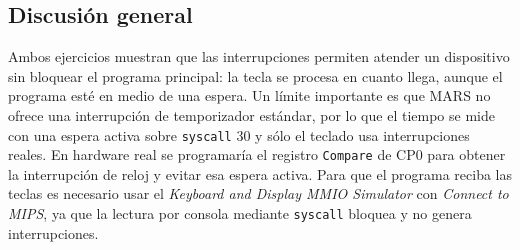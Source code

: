 \documentclass[11pt,a4paper]{article}
\begin{document}
\subsection*{Discusión general}

Ambos ejercicios muestran que las interrupciones permiten atender un dispositivo sin bloquear el programa principal: la tecla se procesa en cuanto llega, aunque el programa esté en medio de una espera. Un límite importante es que MARS no ofrece una interrupción de temporizador estándar, por lo que el tiempo se mide con una espera activa sobre \texttt{syscall} 30 y sólo el teclado usa interrupciones reales. En hardware real se programaría el registro \texttt{Compare} de CP0 para obtener la interrupción de reloj y evitar esa espera activa. Para que el programa reciba las teclas es necesario usar el \emph{Keyboard and Display MMIO Simulator} con \emph{Connect to MIPS}, ya que la lectura por consola mediante \texttt{syscall} bloquea y no genera interrupciones.
\end{document}
